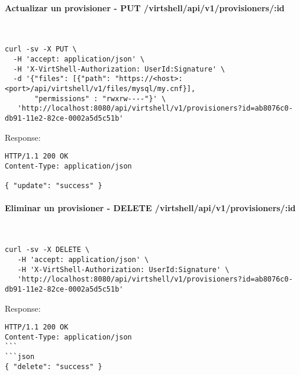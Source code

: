 \paragraph{Actualizar un provisioner - PUT /virtshell/api/v1/provisioners/:id} ~\\

\begin{lstlisting}[style=json]
curl -sv -X PUT \
  -H 'accept: application/json' \
  -H 'X-VirtShell-Authorization: UserId:Signature' \
  -d '{"files": [{"path": "https://<host>:<port>/api/virtshell/v1/files/mysql/my.cnf}],
       "permissions" : "rwxrw----"}' \
   'http://localhost:8080/api/virtshell/v1/provisioners?id=ab8076c0-db91-11e2-82ce-0002a5d5c51b'
\end{lstlisting}

Response:

\begin{lstlisting}[style=json]
HTTP/1.1 200 OK
Content-Type: application/json

{ "update": "success" }
\end{lstlisting}

\paragraph{Eliminar un provisioner - DELETE /virtshell/api/v1/provisioners/:id} ~\\

\begin{lstlisting}[style=json]
curl -sv -X DELETE \
   -H 'accept: application/json' \
   -H 'X-VirtShell-Authorization: UserId:Signature' \
   'http://localhost:8080/api/virtshell/v1/provisioners?id=ab8076c0-db91-11e2-82ce-0002a5d5c51b'
\end{lstlisting}

Response:

\begin{lstlisting}[style=json]
HTTP/1.1 200 OK
Content-Type: application/json
```
```json
{ "delete": "success" }
\end{lstlisting}